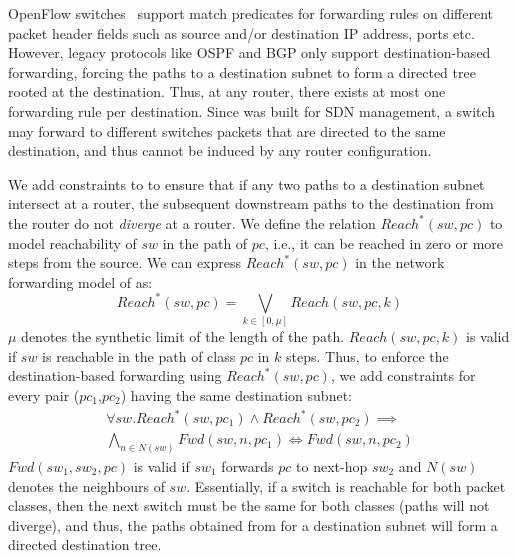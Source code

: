 OpenFlow switches~\cite{openflow} support match predicates for
forwarding rules on different packet header fields such as source
and/or destination IP address, ports etc. However, legacy protocols
like OSPF and BGP only support destination-based forwarding, 
forcing the paths to a destination subnet to 
form a directed tree rooted at the destination. 
Thus,
at any router, there exists at most one forwarding rule per destination. 
Since \genesis was built for
SDN management,  a switch may forward to different switches
packets that are directed to the same destination,
and thus cannot be induced by any router
configuration. 

We add constraints to \genesis to ensure that
if any two paths to a destination subnet intersect at a router,
the subsequent downstream paths to the destination from the
router do not \emph{diverge} at a router.  
We define the relation $Reach^*(sw,pc)$ to model reachability 
of $sw$ in the path of $pc$, i.e., it can be reached in zero or more
steps from the source. We can express $Reach^*(sw,pc)$ 
in the network forwarding model of \genesis as:
\begin{equation}
	Reach^*(sw,pc) = \bigvee_{k \in [0, \mu]} Reach(sw, pc, k)
\end{equation}
$\mu$ denotes the synthetic limit of the length of the path. 
$Reach(sw, pc, k)$ is valid if $sw$ is reachable in the path of
class $pc$ in $k$ steps. Thus, to enforce the destination-based
forwarding using $Reach^*(sw,pc)$, we add
constraints for every pair ($pc_1$,$pc_2$) having the same 
 destination subnet:
 \begin{multline}
 \forall sw. Reach^*(sw, pc_1) \wedge Reach^*(sw, pc_2) 
 \implies \\ \bigwedge_{n \in N(sw)} Fwd(sw, n, pc_1) \Leftrightarrow Fwd(sw, n, pc_2)
 \end{multline}
 $Fwd(sw_1, sw_2,pc)$ is valid if $sw_1$ forwards $pc$ to next-hop $sw_2$ and
 $N(sw)$ denotes the neighbours of $sw$. Essentially, 
 if a switch is reachable for both packet classes, 
 then the next switch must be the same for both classes
 (paths will not diverge), and thus, the paths obtained
 from \genesis for a destination subnet will form a 
 directed destination tree. 


